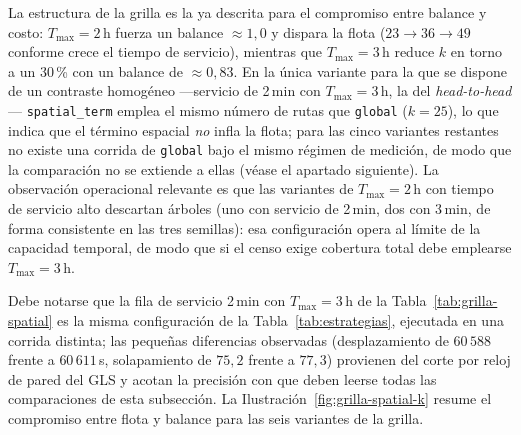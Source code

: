 La estructura de la grilla es la ya descrita para el compromiso entre balance y
costo: $T_{\max}=2$\,h fuerza un balance $\approx 1{,}0$ y dispara la flota
($23 \rightarrow 36 \rightarrow 49$ conforme crece el tiempo de servicio),
mientras que $T_{\max}=3$\,h reduce $k$ en torno a un 30\,\% con un balance de
$\approx 0{,}83$. En la única variante para la que se dispone de un contraste
homogéneo ---servicio de 2\,min con $T_{\max}=3$\,h, la del
\textit{head-to-head}--- \texttt{spatial\_term} emplea el mismo número de rutas
que \texttt{global} ($k=25$), lo que indica que el término espacial \textit{no}
infla la flota; para las cinco variantes restantes no existe una corrida de
\texttt{global} bajo el mismo régimen de medición, de modo que la comparación
no se extiende a ellas (véase el apartado siguiente). La observación
operacional relevante es que las variantes de
$T_{\max}=2$\,h con tiempo de servicio alto descartan árboles (uno con servicio
de 2\,min, dos con 3\,min, de forma consistente en las tres semillas): esa
configuración opera al límite de la capacidad temporal, de modo que si el censo
exige cobertura total debe emplearse $T_{\max}=3$\,h.

Debe notarse que la fila de servicio 2\,min con $T_{\max}=3$\,h de la
Tabla~\ref{tab:grilla-spatial} es la misma configuración de la
Tabla~\ref{tab:estrategias}, ejecutada en una corrida distinta; las pequeñas
diferencias observadas (desplazamiento de $60\,588$ frente a $60\,611$\,s,
solapamiento de $75{,}2$ frente a $77{,}3$) provienen del corte por reloj de
pared del GLS y acotan la precisión con que deben leerse todas las comparaciones
de esta subsección. La Ilustración~\ref{fig:grilla-spatial-k} resume el compromiso
entre flota y balance para las seis variantes de la grilla.

